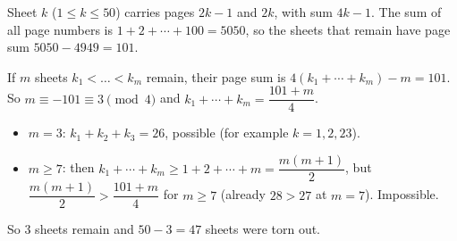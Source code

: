 Sheet $k$ ($1\le k\le50$) carries pages $2k-1$ and $2k$, with sum $4k-1$. The sum of all page numbers is $1+2+\cdots+100=5050$, so the sheets that remain have page sum $5050-4949=101$.

If $m$ sheets $k_1<\dots<k_m$ remain, their page sum is $4(k_1+\cdots+k_m)-m=101$. So $m\equiv-101\equiv3\pmod 4$ and $k_1+\cdots+k_m=\dfrac{101+m}{4}$.
\begin{itemize}
\item $m=3$: $k_1+k_2+k_3=26$, possible (for example $k=1,2,23$).
\item $m\ge7$: then $k_1+\cdots+k_m\ge1+2+\cdots+m=\dfrac{m(m+1)}{2}$, but $\dfrac{m(m+1)}{2}>\dfrac{101+m}{4}$ for $m\ge7$ (already $28>27$ at $m=7$). Impossible.
\end{itemize}
So $3$ sheets remain and $50-3=\boxed{47}$ sheets were torn out.
